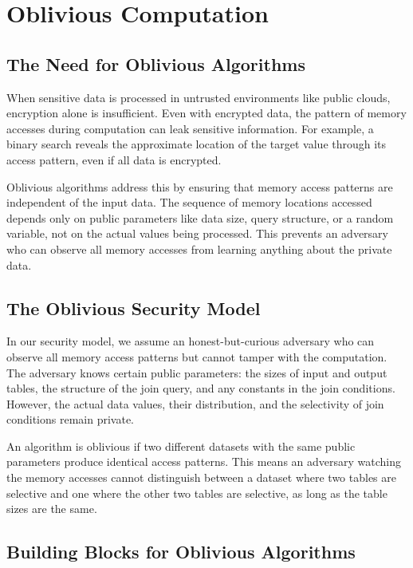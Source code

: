 \section{Oblivious Computation}

\subsection{The Need for Oblivious Algorithms}

When sensitive data is processed in untrusted environments like public clouds, encryption alone is insufficient. Even with encrypted data, the pattern of memory accesses during computation can leak sensitive information. For example, a binary search reveals the approximate location of the target value through its access pattern, even if all data is encrypted.

Oblivious algorithms address this by ensuring that memory access patterns are independent of the input data. The sequence of memory locations accessed depends only on public parameters like data size, query structure, or a random variable, not on the actual values being processed. This prevents an adversary who can observe all memory accesses from learning anything about the private data.

\subsection{The Oblivious Security Model}

In our security model, we assume an honest-but-curious adversary who can observe all memory access patterns but cannot tamper with the computation. The adversary knows certain public parameters: the sizes of input and output tables, the structure of the join query, and any constants in the join conditions. However, the actual data values, their distribution, and the selectivity of join conditions remain private.

An algorithm is oblivious if two different datasets with the same public parameters produce identical access patterns. This means an adversary watching the memory accesses cannot distinguish between a dataset where two tables are selective and one where the other two tables are selective, as long as the table sizes are the same.

\subsection{Building Blocks for Oblivious Algorithms}

